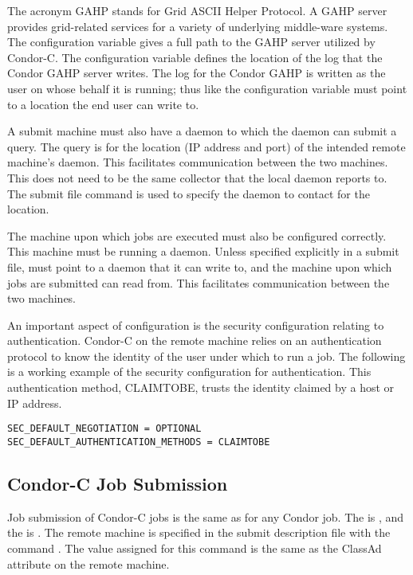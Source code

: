The acronym GAHP stands for Grid ASCII Helper Protocol.
A GAHP server provides grid-related services for a
variety of underlying middle-ware systems.
The configuration variable 
gives a full path to the GAHP server utilized by Condor-C.
The configuration variable  defines
the location of the log that the Condor GAHP server writes.
The log for the Condor GAHP is written as the user on whose
behalf it is running; thus like  the
 configuration variable must point to a location the end
user can write to.

A submit machine must also have a  daemon to which the
 daemon can submit a query.
The query is for the location (IP address and port)
of the intended remote machine's  daemon.
This facilitates communication between the two machines.
This  does not need to be the same collector
that the local  daemon reports to.
The 
submit file command is used to specify the 
daemon to contact for the location.

The machine upon which jobs are executed 
must also be configured correctly.
This machine must be running a  daemon.
Unless specified explicitly in a submit file, 
 must point to a 
 daemon that it can write to,
and the machine upon which jobs are submitted can read from.
This facilitates communication between the two machines.

An important aspect of configuration is the security 
configuration relating to authentication.
Condor-C on the remote machine relies on an
authentication protocol to
know the identity of the user under which to run a job.
The following is a working example
of the security configuration for authentication.
This authentication method, CLAIMTOBE, 
trusts the identity claimed by a host or IP address.

\footnotesize
\begin{verbatim}
SEC_DEFAULT_NEGOTIATION = OPTIONAL
SEC_DEFAULT_AUTHENTICATION_METHODS = CLAIMTOBE
\end{verbatim}
\normalsize


\subsection{\label{sec:Condor-C-Submit}Condor-C Job Submission}
Job submission of Condor-C jobs is the same as for any Condor job.
The  is ,
and the  is . 
The remote machine is specified in
the submit description file with the command .
The value assigned for this command is the same as
the  ClassAd attribute
 on the remote machine.

